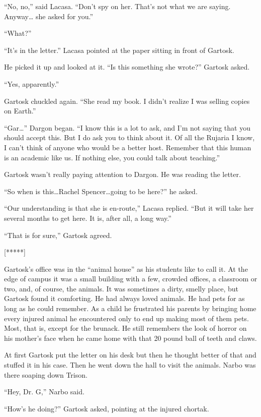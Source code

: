 ``No, no,'' said Lacasa. ``Don't spy on her. That's not what we are saying. Anyway\ldots
she asked for you.''

``What?''

``It's in the letter.'' Lacasa pointed at the paper sitting in front of Gartosk.

He picked it up and looked at it. ``Is this something she wrote?'' Gartosk asked.

``Yes, apparently.''

Gartosk chuckled again. ``She read my book. I didn't realize I was selling copies on
Earth.''

``Gar\ldots'' Dargon began. ``I know this is a lot to ask, and I'm not saying that you
should accept this. But I do ask you to think about it. Of all the Rujaria I know, I can't
think of anyone who would be a better host. Remember that this human is an academic like us. If
nothing else, you could talk about teaching.''

Gartosk wasn't really paying attention to Dargon. He was reading the letter.

``So when is this\ldots Rachel Spencer\ldots going to be here?'' he asked.

``Our understanding is that she is en-route,'' Lacasa replied. ``But it will take her
several months to get here. It is, after all, a long way.''

``That is for sure,'' Gartosk agreed.

[*****]

Gartosk's office was in the ``animal house'' as his students like to call it. At the edge
of campus it was a small building with a few, crowded offices, a classroom or two, and, of
course, the animals. It was sometimes a dirty, smelly place, but Gartosk found it comforting. He
had always loved animals. He had pets for as long as he could remember. As a child he frustrated
his parents by bringing home every injured animal he encountered only to end up making most of
them pets. Most, that is, except for the brunack. He still remembers the look of horror on his
mother's face when he came home with that 20 pound ball of teeth and claws.

At first Gartosk put the letter on his desk but then he thought better of that and stuffed it in
his case. Then he went down the hall to visit the animals. Narbo was there soaping down Trison.

``Hey, Dr. G,'' Narbo said.

``How's he doing?'' Gartosk asked, pointing at the injured chortak.

